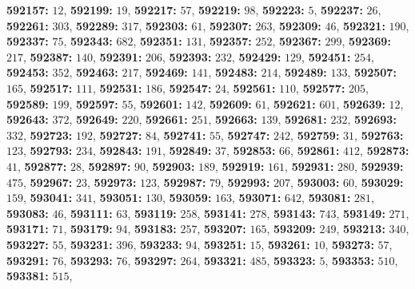 \textsf{\bfseries 592157:} $12$, \textsf{\bfseries 592199:} $19$, \textsf{\bfseries 592217:} $57$, \textsf{\bfseries 592219:} $98$, \textsf{\bfseries 592223:} $5$, \textsf{\bfseries 592237:} $26$, \textsf{\bfseries 592261:} $303$, \textsf{\bfseries 592289:} $317$, \textsf{\bfseries 592303:} $61$, \textsf{\bfseries 592307:} $263$, \textsf{\bfseries 592309:} $46$, \textsf{\bfseries 592321:} $190$, \textsf{\bfseries 592337:} $75$, \textsf{\bfseries 592343:} $682$, \textsf{\bfseries 592351:} $131$, \textsf{\bfseries 592357:} $252$, \textsf{\bfseries 592367:} $299$, \textsf{\bfseries 592369:} $217$, \textsf{\bfseries 592387:} $140$, \textsf{\bfseries 592391:} $206$, \textsf{\bfseries 592393:} $232$, \textsf{\bfseries 592429:} $129$, \textsf{\bfseries 592451:} $254$, \textsf{\bfseries 592453:} $352$, \textsf{\bfseries 592463:} $217$, \textsf{\bfseries 592469:} $141$, \textsf{\bfseries 592483:} $214$, \textsf{\bfseries 592489:} $133$, \textsf{\bfseries 592507:} $165$, \textsf{\bfseries 592517:} $111$, \textsf{\bfseries 592531:} $186$, \textsf{\bfseries 592547:} $24$, \textsf{\bfseries 592561:} $110$, \textsf{\bfseries 592577:} $205$, \textsf{\bfseries 592589:} $199$, \textsf{\bfseries 592597:} $55$, \textsf{\bfseries 592601:} $142$, \textsf{\bfseries 592609:} $61$, \textsf{\bfseries 592621:} $601$, \textsf{\bfseries 592639:} $12$, \textsf{\bfseries 592643:} $372$, \textsf{\bfseries 592649:} $220$, \textsf{\bfseries 592661:} $251$, \textsf{\bfseries 592663:} $139$, \textsf{\bfseries 592681:} $232$, \textsf{\bfseries 592693:} $332$, \textsf{\bfseries 592723:} $192$, \textsf{\bfseries 592727:} $84$, \textsf{\bfseries 592741:} $55$, \textsf{\bfseries 592747:} $242$, \textsf{\bfseries 592759:} $31$, \textsf{\bfseries 592763:} $123$, \textsf{\bfseries 592793:} $234$, \textsf{\bfseries 592843:} $191$, \textsf{\bfseries 592849:} $37$, \textsf{\bfseries 592853:} $66$, \textsf{\bfseries 592861:} $412$, \textsf{\bfseries 592873:} $41$, \textsf{\bfseries 592877:} $28$, \textsf{\bfseries 592897:} $90$, \textsf{\bfseries 592903:} $189$, \textsf{\bfseries 592919:} $161$, \textsf{\bfseries 592931:} $280$, \textsf{\bfseries 592939:} $475$, \textsf{\bfseries 592967:} $23$, \textsf{\bfseries 592973:} $123$, \textsf{\bfseries 592987:} $79$, \textsf{\bfseries 592993:} $207$, \textsf{\bfseries 593003:} $60$, \textsf{\bfseries 593029:} $159$, \textsf{\bfseries 593041:} $341$, \textsf{\bfseries 593051:} $130$, \textsf{\bfseries 593059:} $163$, \textsf{\bfseries 593071:} $642$, \textsf{\bfseries 593081:} $281$, \textsf{\bfseries 593083:} $46$, \textsf{\bfseries 593111:} $63$, \textsf{\bfseries 593119:} $258$, \textsf{\bfseries 593141:} $278$, \textsf{\bfseries 593143:} $743$, \textsf{\bfseries 593149:} $271$, \textsf{\bfseries 593171:} $71$, \textsf{\bfseries 593179:} $94$, \textsf{\bfseries 593183:} $257$, \textsf{\bfseries 593207:} $165$, \textsf{\bfseries 593209:} $249$, \textsf{\bfseries 593213:} $340$, \textsf{\bfseries 593227:} $55$, \textsf{\bfseries 593231:} $396$, \textsf{\bfseries 593233:} $94$, \textsf{\bfseries 593251:} $15$, \textsf{\bfseries 593261:} $10$, \textsf{\bfseries 593273:} $57$, \textsf{\bfseries 593291:} $76$, \textsf{\bfseries 593293:} $76$, \textsf{\bfseries 593297:} $264$, \textsf{\bfseries 593321:} $485$, \textsf{\bfseries 593323:} $5$, \textsf{\bfseries 593353:} $510$, \textsf{\bfseries 593381:} $515$, 
